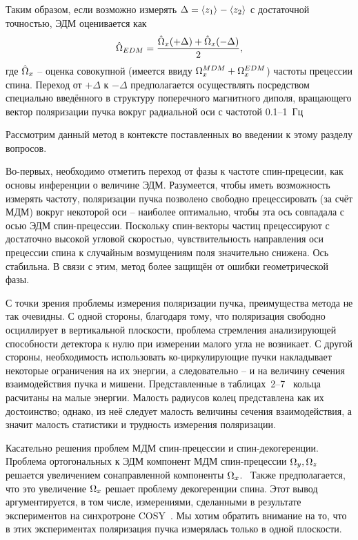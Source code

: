 Таким образом, если возможно измерять $\Delta = \avg{z_1} - \avg{z_2}$ с достаточной точностью, 
ЭДМ оценивается как
\begin{equation}\label{eq:SW:EDM-estimator}
	\hat{\Omega}_{EDM} = \frac{\hat{\Omega}_x(+\Delta) + \hat{\Omega}_x(-\Delta)}{2},
\end{equation}
где $\hat{\Omega}_x$ -- оценка совокупной (имеется ввиду $\Omega_x^{MDM} + \Omega_x^{EDM}$) частоты прецессии спина.
Переход от $+\Delta$ к $-\Delta$ предполагается осуществлять посредством специально введённого
в структуру поперечного магнитного диполя, вращающего вектор поляризации пучка вокруг радиальной оси
с частотой 0.1--1~Гц~\cite[стр.~4]{Koop:SpinWheel2015} 

Рассмотрим данный метод в контексте поставленных во введении к этому разделу вопросов.

Во-первых, необходимо отметить переход от фазы к частоте спин-прецесии, 
как основы инференции о величине ЭДМ. Разумеется, чтобы иметь возможность измерять частоту,
поляризации пучка позволено свободно прецессировать (за счёт МДМ) вокруг некоторой оси -- 
наиболее оптимально, чтобы эта ось совпадала с осью ЭДМ спин-прецессии. Поскольку спин-векторы частиц
прецессируют с достаточно высокой угловой скоростью, чувствительность направления оси прецессии спина
к случайным возмущениям поля значительно снижена. Ось стабильна. В связи с этим, метод более защищён 
от ошибки геометрической фазы.

С точки зрения проблемы измерения поляризации пучка, преимущества метода не так очевидны. 
С одной стороны, благодаря тому, что поляризация свободно осциллирует в вертикальной плоскости, 
проблема стремления анализирующей способности детектора к нулю при измерении малого угла 
не возникает.
С другой стороны, необходимость использовать ко-циркулирующие пучки 
накладывает некоторые ограничения на их энергии, а следовательно -- и на величину
сечения взаимодействия пучка и мишени. Представленные в 
таблицах~2--7~\cite{Koop:SpinWheel2015} кольца расчитаны на малые энергии. 
Малость радиусов колец представлена как их достоинство; однако, из неё следует малость величины
сечения взаимодействия, а значит малость статистики и трудность измерения поляризации. 

Касательно решения проблем МДМ спин-прецессии и спин-декогеренции. 
Проблема ортогональных к ЭДМ компонент МДМ спин-прецессии $\Omega_y, \Omega_z$ решается увеличением 
сонаправленной компоненты $\Omega_x$.~\cite[стр.~5, ур.~(14)]{Koop:SpinWheel2015} 
Также предполагается, что это увеличение $\Omega_x$ решает проблему декогеренции спина. 
Этот вывод аргументируется, в том числе, измерениями, сделанными в результате экспериментов 
на синхротроне COSY~\cite{COSY:DAQ}. Мы хотим обратить внимание на то, что в этих экспериментах
поляризация пучка измерялась только в одной плоскости. 

